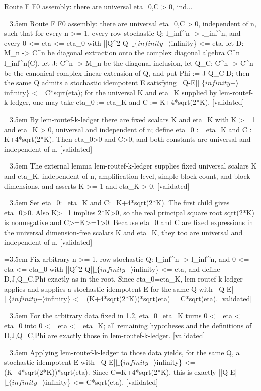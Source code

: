 \documentclass{article}
\newcommand{\step}[1]{\par\noindent\hangindent=3.5em\hangafter=1%
  \makebox[3.5em][l]{\textbf{#1.}}}
\newcommand{\steptag}[1]{\hfill{\small\textsf{[#1]}}}
\begin{document}
\begin{proofbox}{Route F F0 assembly: there are universal eta\_0,C > 0, ind...}
\step{1} Route F F0 assembly: there are universal eta\_0,C > 0, independent of n, such that for every n >= 1, every row-stochastic Q: l\_inf\textasciicircum{}n -> l\_inf\textasciicircum{}n, and every 0 <= eta <= eta\_0 with ||Q\textasciicircum{}2-Q|$|\_\{infinity-\rangle$infinity\} <= eta, let D: M\_n -> C\textasciicircum{}n be diagonal extraction onto the complex diagonal algebra C\textasciicircum{}n = l\_inf\textasciicircum{}n(C), let J: C\textasciicircum{}n -> M\_n be the diagonal inclusion, let Q\_C: C\textasciicircum{}n -> C\textasciicircum{}n be the canonical complex-linear extension of Q, and put Phi := J Q\_C D; then the same Q admits a stochastic idempotent E satisfying ||Q-E|$|\_\{infinity-\rangle$infinity\} <= C*sqrt(eta); for the universal K and eta\_K supplied by lem-routef-k-ledger, one may take eta\_0 := eta\_K and C := K+4*sqrt(2*K). \steptag{validated} \\[6pt]
\step{1.1} By lem-routef-k-ledger there are fixed scalars K and eta\_K with K >= 1 and eta\_K > 0, universal and independent of n; define eta\_0 := eta\_K and C := K+4*sqrt(2*K). Then eta\_0>0 and C>0, and both constants are universal and independent of n. \steptag{validated} \\[6pt]
\step{1.1.1} The external lemma lem-routef-k-ledger supplies fixed universal scalars K and eta\_K, independent of n, amplification level, simple-block count, and block dimensions, and asserts K >= 1 and eta\_K > 0. \steptag{validated} \\[4pt]
\step{1.1.2} Set eta\_0:=eta\_K and C:=K+4*sqrt(2*K). The first child gives eta\_0>0. Also K>=1 implies 2*K>0, so the real principal square root sqrt(2*K) is nonnegative and C>=K>=1>0. Because eta\_0 and C are fixed expressions in the universal dimension-free scalars K and eta\_K, they too are universal and independent of n. \steptag{validated} \\[4pt]
\step{1.2} Fix arbitrary n >= 1, row-stochastic Q: l\_inf\textasciicircum{}n -> l\_inf\textasciicircum{}n, and 0 <= eta <= eta\_0 with ||Q\textasciicircum{}2-Q|$|\_\{infinity-\rangle$infinity\} <= eta, and define D,J,Q\_C,Phi exactly as in the root. Since eta\_0=eta\_K, lem-routef-k-ledger applies and supplies a stochastic idempotent E for the same Q with ||Q-E|$|\_\{infinity-\rangle$infinity\} <= (K+4*sqrt(2*K))*sqrt(eta) = C*sqrt(eta). \steptag{validated} \\[6pt]
\step{1.2.1} For the arbitrary data fixed in 1.2, eta\_0=eta\_K turns 0 <= eta <= eta\_0 into 0 <= eta <= eta\_K; all remaining hypotheses and the definitions of D,J,Q\_C,Phi are exactly those in lem-routef-k-ledger. \steptag{validated} \\[4pt]
\step{1.2.2} Applying lem-routef-k-ledger to those data yields, for the same Q, a stochastic idempotent E with ||Q-E|$|\_\{infinity-\rangle$infinity\} <= (K+4*sqrt(2*K))*sqrt(eta). Since C=K+4*sqrt(2*K), this is exactly ||Q-E|$|\_\{infinity-\rangle$infinity\} <= C*sqrt(eta). \steptag{validated} \\[4pt]
\end{proofbox}
\end{document}
